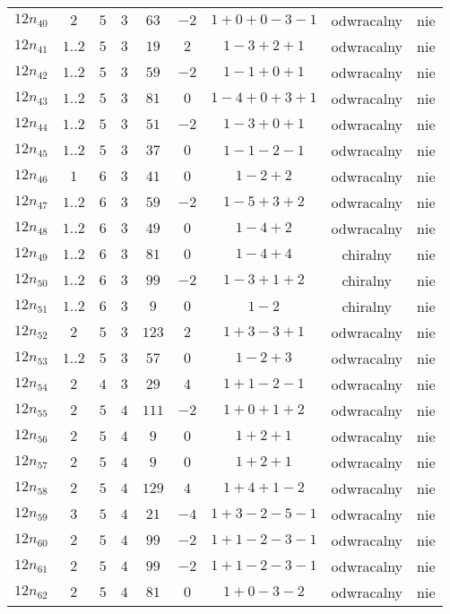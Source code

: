 \begin{longtable}{ccccccccc}
$12n_{40}$ & $2$ & $5$ & $3$ & $63$ & $-2$ & $1+0+0-3-1$ & odwracalny & nie \\
$12n_{41}$ & $1..2$ & $5$ & $3$ & $19$ & $2$ & $1-3+2+1$ & odwracalny & nie \\
$12n_{42}$ & $1..2$ & $5$ & $3$ & $59$ & $-2$ & $1-1+0+1$ & odwracalny & nie \\
$12n_{43}$ & $1..2$ & $5$ & $3$ & $81$ & $0$ & $1-4+0+3+1$ & odwracalny & nie \\
$12n_{44}$ & $1..2$ & $5$ & $3$ & $51$ & $-2$ & $1-3+0+1$ & odwracalny & nie \\
$12n_{45}$ & $1..2$ & $5$ & $3$ & $37$ & $0$ & $1-1-2-1$ & odwracalny & nie \\
$12n_{46}$ & $1$ & $6$ & $3$ & $41$ & $0$ & $1-2+2$ & odwracalny & nie \\
$12n_{47}$ & $1..2$ & $6$ & $3$ & $59$ & $-2$ & $1-5+3+2$ & odwracalny & nie \\
$12n_{48}$ & $1..2$ & $6$ & $3$ & $49$ & $0$ & $1-4+2$ & odwracalny & nie \\
$12n_{49}$ & $1..2$ & $6$ & $3$ & $81$ & $0$ & $1-4+4$ & chiralny & nie \\
$12n_{50}$ & $1..2$ & $6$ & $3$ & $99$ & $-2$ & $1-3+1+2$ & chiralny & nie \\
$12n_{51}$ & $1..2$ & $6$ & $3$ & $9$ & $0$ & $1-2$ & chiralny & nie \\
$12n_{52}$ & $2$ & $5$ & $3$ & $123$ & $2$ & $1+3-3+1$ & odwracalny & nie \\
$12n_{53}$ & $1..2$ & $5$ & $3$ & $57$ & $0$ & $1-2+3$ & odwracalny & nie \\
$12n_{54}$ & $2$ & $4$ & $3$ & $29$ & $4$ & $1+1-2-1$ & odwracalny & nie \\
$12n_{55}$ & $2$ & $5$ & $4$ & $111$ & $-2$ & $1+0+1+2$ & odwracalny & nie \\
$12n_{56}$ & $2$ & $5$ & $4$ & $9$ & $0$ & $1+2+1$ & odwracalny & nie \\
$12n_{57}$ & $2$ & $5$ & $4$ & $9$ & $0$ & $1+2+1$ & odwracalny & nie \\
$12n_{58}$ & $2$ & $5$ & $4$ & $129$ & $4$ & $1+4+1-2$ & odwracalny & nie \\
$12n_{59}$ & $3$ & $5$ & $4$ & $21$ & $-4$ & $1+3-2-5-1$ & odwracalny & nie \\
$12n_{60}$ & $2$ & $5$ & $4$ & $99$ & $-2$ & $1+1-2-3-1$ & odwracalny & nie \\
$12n_{61}$ & $2$ & $5$ & $4$ & $99$ & $-2$ & $1+1-2-3-1$ & odwracalny & nie \\
$12n_{62}$ & $2$ & $5$ & $4$ & $81$ & $0$ & $1+0-3-2$ & odwracalny & nie \\

\end{longtable}

